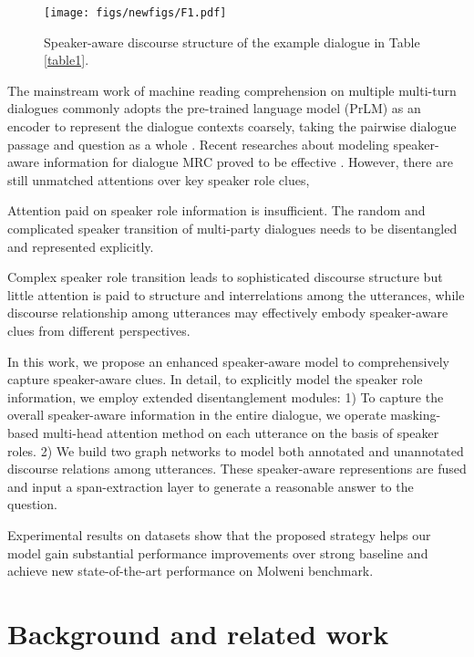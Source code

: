 \documentclass[letterpaper]{article} \usepackage{stylefile}  \usepackage{times}  \usepackage{helvet}  \usepackage{courier}  \usepackage[hyphens]{url}  \usepackage{graphicx} \urlstyle{rm} \def\UrlFont{\rm}  \usepackage{natbib}  \usepackage{caption} \DeclareCaptionStyle{ruled}{labelfont=normalfont,labelsep=colon,strut=off} \frenchspacing  \setlength{\pdfpagewidth}{8.5in}  \setlength{\pdfpageheight}{11in}  \usepackage{algorithm}
\begin{document}
\begin{figure}[t]
		\centering
		\texttt{[image: figs/newfigs/F1.pdf]}
		\caption{\label{discouse} Speaker-aware discourse structure of the example dialogue in Table \ref{table1}. }
\end{figure}

The mainstream work of machine reading comprehension on multiple multi-turn dialogues commonly adopts the pre-trained language model (PrLM) \cite{devlin2019bert} as an encoder to represent the dialogue contexts coarsely, taking the pairwise dialogue passage and question as a whole \cite{qu2019bert,Gusabert,li2020molweni}. Recent researches about modeling speaker-aware information for dialogue MRC proved to be effective \cite{Gusabert, liumdfn}. However, there are still unmatched attentions over key speaker role clues,

  Attention paid on speaker role information is insufficient. The random and complicated speaker transition of multi-party dialogues needs to be disentangled and represented explicitly. 

  Complex speaker role transition leads to sophisticated discourse structure but little attention is paid to structure and interrelations among the utterances, while discourse relationship among utterances may effectively embody speaker-aware clues from different perspectives.


In this work, we propose an enhanced speaker-aware model to comprehensively capture speaker-aware clues. In detail, 
to explicitly model the speaker role information, we employ extended disentanglement modules: 1) To capture the overall speaker-aware information in the entire dialogue, we operate masking-based multi-head attention method on each utterance on the basis of speaker roles. 2) We build two graph networks to model both annotated and unannotated discourse relations among utterances. These speaker-aware representions are fused and input a span-extraction layer to generate a reasonable answer to the question.


Experimental results on datasets show that the proposed strategy helps our model gain substantial performance improvements over strong baseline and achieve new state-of-the-art performance on Molweni \cite{li2020molweni} benchmark. 

\section{Background and related work}
\end{document}
